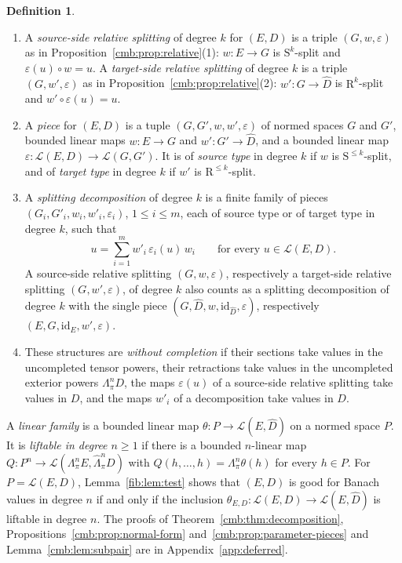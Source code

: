 \documentclass[11pt]{amsart}
\theoremstyle{definition}
\newtheorem{definition}[theorem]{Definition}
\theoremstyle{remark}
\numberwithin{equation}{section}
\newcommand{\cL}{\mathcal L}
\newcommand{\id}{\mathrm{id}}
\theoremstyle{plain}
\theoremstyle{definition}
\theoremstyle{plain}
\begin{document}
\begin{definition}\label{cmb:def:decomposition}
\begin{enumerate}
\item A \emph{source-side relative splitting} of degree $k$ for $(E,D)$ is a triple $(G,w,\varepsilon)$ as in
Proposition~\ref{cmb:prop:relative}(1): $w\colon E\to G$ is $\mathrm S^k$-split and $\varepsilon(u)\circ w=u$. A
\emph{target-side relative splitting} of degree $k$ is a triple $(G,w',\varepsilon)$ as in
Proposition~\ref{cmb:prop:relative}(2): $w'\colon G\to\widehat D$ is $\mathrm R^k$-split and $w'\circ\varepsilon(u)=u$.
\item A \emph{piece} for $(E,D)$ is a tuple $(G,G',w,w',\varepsilon)$ of normed spaces $G$ and $G'$, bounded linear maps
$w\colon E\to G$ and $w'\colon G'\to\widehat D$, and a bounded linear map $\varepsilon\colon\cL(E,D)\to\cL(G,G')$. It is
of \emph{source type} in degree $k$ if $w$ is $\mathrm S^{\le k}$-split, and of \emph{target type} in degree $k$ if
$w'$ is $\mathrm R^{\le k}$-split.
\item A \emph{splitting decomposition} of degree $k$ is a finite family of pieces $(G_i,G'_i,w_i,w'_i,\varepsilon_i)$,
$1\le i\le m$, each of source type or of target type in degree $k$, such that
\begin{equation}\label{cmb:eq:decomposition}
 u=\sum_{i=1}^mw'_i\,\varepsilon_i(u)\,w_i\qquad\text{for every }u\in\cL(E,D).
\end{equation}
A source-side relative splitting $(G,w,\varepsilon)$, respectively a target-side relative splitting
$(G,w',\varepsilon)$, of degree $k$ also counts as a splitting decomposition of degree $k$ with the single piece
$(G,\widehat D,w,\id_{\widehat D},\varepsilon)$, respectively $(E,G,\id_E,w',\varepsilon)$.
\item These structures are \emph{without completion} if their sections take values in the uncompleted tensor powers,
their retractions take values in the uncompleted exterior powers $\Lambda^n_\pi D$, the maps $\varepsilon(u)$ of a
source-side relative splitting take values in $D$, and the maps $w'_i$ of a decomposition take values in $D$.
\end{enumerate}
\end{definition}

A \emph{linear family} is a bounded linear map $\theta\colon P\to\cL(E,\widehat D)$ on a normed space $P$. It is
\emph{liftable in degree $n\ge1$} if there is a bounded $n$-linear map
$Q\colon P^n\to\cL(\Lambda^n_\pi E,\widehat\Lambda^n_\pi D)$ with $Q(h,\dots,h)=\Lambda^n_\pi\theta(h)$ for every $h\in P$.
For $P=\cL(E,D)$, Lemma~\ref{fib:lem:test} shows that $(E,D)$ is good for Banach values in degree $n$ if and only if the
inclusion $\theta_{E,D}\colon\cL(E,D)\to\cL(E,\widehat D)$ is liftable in degree $n$. The proofs of
Theorem~\ref{cmb:thm:decomposition}, Propositions~\ref{cmb:prop:normal-form} and~\ref{cmb:prop:parameter-pieces} and
Lemma~\ref{cmb:lem:subpair} are in Appendix~\ref{app:deferred}.
\end{document}
